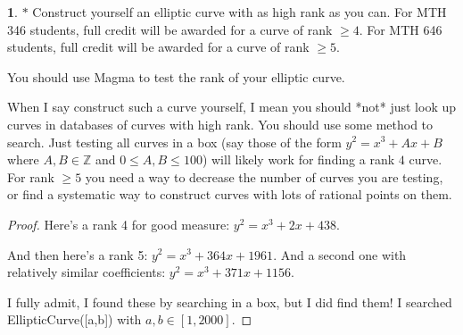 \documentclass[12pt]{article}
\theoremstyle{definition}
\newtheorem{ex}{}
\begin{document}
\begin{ex}
	$*$ Construct yourself an elliptic curve with as high rank as you can.
	For MTH 346 students, full credit will be awarded for a curve of rank $\geq 4$.
	For MTH 646 students, full credit will be awarded for a curve of rank $\geq 5$.

	You should use Magma to test the rank of your elliptic curve.

	When I say construct such a curve yourself, I mean you should *not* just
	look up curves in databases of curves with high rank. You should use some
	method to search. Just testing all curves in a box (say those of the form
	$y^{2} = x^{3} + Ax + B$ where $A, B \in \mathbb{Z}$ and $0 \leq A,B \leq 100$) will likely work for finding a rank $4$ curve. For rank $\geq 5$ you need a way to decrease the number of curves
	you are testing, or find a systematic way to construct curves with lots of rational points on them.
\end{ex}
\begin{proof}
	Here's a rank 4 for good measure: $y^2 = x^3 + 2x + 438$.

	And then here's a rank 5: $y^2 = x^3 + 364x + 1961$.
	And a second one with relatively similar coefficients: $y^2 = x^3 + 371x + 1156$.

	I fully admit, I found these by searching in a box, but I did find them!
	I searched EllipticCurve([a,b]) with $a,b \in [1, 2000]$.
\end{proof}
\end{document}
